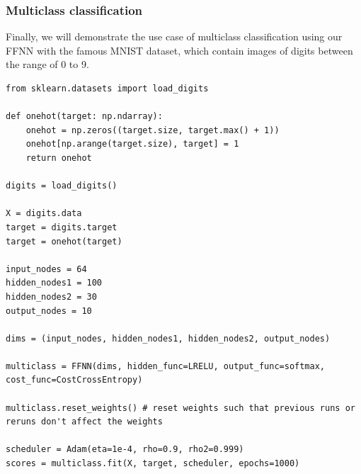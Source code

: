 \documentclass{beamer}
\begin{document}
\begin{frame}
\frametitle{Multiclass classification}

Finally, we will demonstrate the use case of multiclass classification
using our FFNN with the famous MNIST dataset, which contain images of
digits between the range of 0 to 9.





























\begin{verbatim}
from sklearn.datasets import load_digits

def onehot(target: np.ndarray):
    onehot = np.zeros((target.size, target.max() + 1))
    onehot[np.arange(target.size), target] = 1
    return onehot

digits = load_digits()

X = digits.data
target = digits.target
target = onehot(target)

input_nodes = 64
hidden_nodes1 = 100
hidden_nodes2 = 30
output_nodes = 10

dims = (input_nodes, hidden_nodes1, hidden_nodes2, output_nodes)

multiclass = FFNN(dims, hidden_func=LRELU, output_func=softmax, cost_func=CostCrossEntropy)

multiclass.reset_weights() # reset weights such that previous runs or reruns don't affect the weights

scheduler = Adam(eta=1e-4, rho=0.9, rho2=0.999)
scores = multiclass.fit(X, target, scheduler, epochs=1000)


\end{verbatim}
\end{frame}
\end{document}
